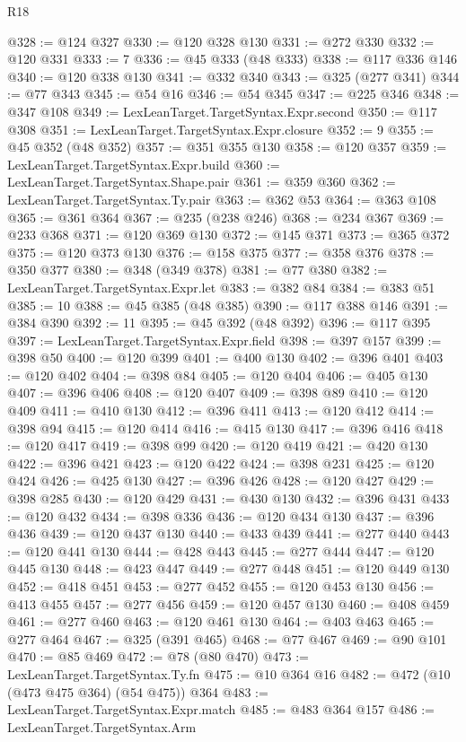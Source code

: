 \begin{lexlean}{R18}
\begin{coremodule}
@328 := @124 @327
@330 := @120 @328 @130
@331 := @272 @330
@332 := @120 @331
@333 := 7
@336 := @45 @333 (@48 @333)
@338 := @117 @336 @146
@340 := @120 @338 @130
@341 := @332 @340
@343 := @325 (@277 @341)
@344 := @77 @343
@345 := @54 @16
@346 := @54 @345
@347 := @225 @346
@348 := @347 @108
@349 := LexLeanTarget.TargetSyntax.Expr.second
@350 := @117 @308
@351 := LexLeanTarget.TargetSyntax.Expr.closure
@352 := 9
@355 := @45 @352 (@48 @352)
@357 := @351 @355 @130
@358 := @120 @357
@359 := LexLeanTarget.TargetSyntax.Expr.build
@360 := LexLeanTarget.TargetSyntax.Shape.pair
@361 := @359 @360
@362 := LexLeanTarget.TargetSyntax.Ty.pair
@363 := @362 @53
@364 := @363 @108
@365 := @361 @364
@367 := @235 (@238 @246)
@368 := @234 @367
@369 := @233 @368
@371 := @120 @369 @130
@372 := @145 @371
@373 := @365 @372
@375 := @120 @373 @130
@376 := @158 @375
@377 := @358 @376
@378 := @350 @377
@380 := @348 (@349 @378)
@381 := @77 @380
@382 := LexLeanTarget.TargetSyntax.Expr.let
@383 := @382 @84
@384 := @383 @51
@385 := 10
@388 := @45 @385 (@48 @385)
@390 := @117 @388 @146
@391 := @384 @390
@392 := 11
@395 := @45 @392 (@48 @392)
@396 := @117 @395
@397 := LexLeanTarget.TargetSyntax.Expr.field
@398 := @397 @157
@399 := @398 @50
@400 := @120 @399
@401 := @400 @130
@402 := @396 @401
@403 := @120 @402
@404 := @398 @84
@405 := @120 @404
@406 := @405 @130
@407 := @396 @406
@408 := @120 @407
@409 := @398 @89
@410 := @120 @409
@411 := @410 @130
@412 := @396 @411
@413 := @120 @412
@414 := @398 @94
@415 := @120 @414
@416 := @415 @130
@417 := @396 @416
@418 := @120 @417
@419 := @398 @99
@420 := @120 @419
@421 := @420 @130
@422 := @396 @421
@423 := @120 @422
@424 := @398 @231
@425 := @120 @424
@426 := @425 @130
@427 := @396 @426
@428 := @120 @427
@429 := @398 @285
@430 := @120 @429
@431 := @430 @130
@432 := @396 @431
@433 := @120 @432
@434 := @398 @336
@436 := @120 @434 @130
@437 := @396 @436
@439 := @120 @437 @130
@440 := @433 @439
@441 := @277 @440
@443 := @120 @441 @130
@444 := @428 @443
@445 := @277 @444
@447 := @120 @445 @130
@448 := @423 @447
@449 := @277 @448
@451 := @120 @449 @130
@452 := @418 @451
@453 := @277 @452
@455 := @120 @453 @130
@456 := @413 @455
@457 := @277 @456
@459 := @120 @457 @130
@460 := @408 @459
@461 := @277 @460
@463 := @120 @461 @130
@464 := @403 @463
@465 := @277 @464
@467 := @325 (@391 @465)
@468 := @77 @467
@469 := @90 @101
@470 := @85 @469
@472 := @78 (@80 @470)
@473 := LexLeanTarget.TargetSyntax.Ty.fn
@475 := @10 @364 @16
@482 := @472 (@10 (@473 @475 @364) (@54 @475)) @364
@483 := LexLeanTarget.TargetSyntax.Expr.match
@485 := @483 @364 @157
@486 := LexLeanTarget.TargetSyntax.Arm

\end{coremodule}
\end{lexlean}
